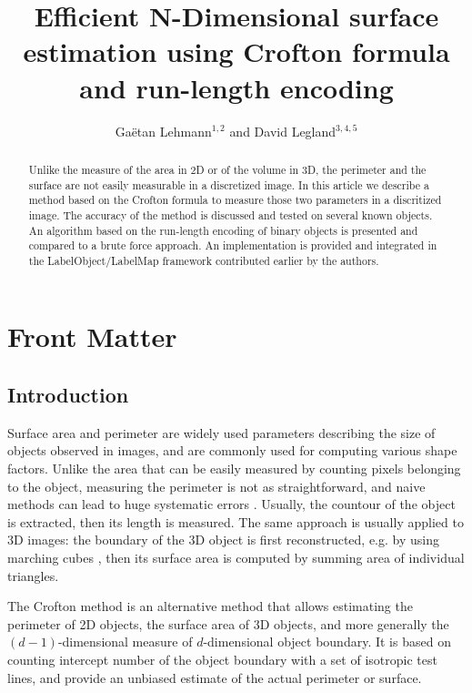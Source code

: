 \documentclass{InsightArticle}
\title{Efficient N-Dimensional surface estimation using Crofton formula and run-length encoding}
\author{Ga\"etan Lehmann$^{1,2}$ {\small{and}} David Legland$^{3,4,5}$}
\begin{document}
\maketitle

\ifhtml
\chapter*{Front Matter\label{front}}
\fi


\begin{abstract}
\noindent
Unlike the measure of the area in 2D or of the volume in 3D, the perimeter and the surface are not easily measurable in a discretized image.
In this article we describe a method based on the Crofton formula to measure those two parameters in a discritized image. The accuracy of
the method is discussed and tested on several known objects. An algorithm based on the run-length encoding of binary objects is presented
and compared to a brute force approach.
An implementation is provided and integrated in the LabelObject/LabelMap framework contributed earlier by the authors.
\end{abstract}

\tableofcontents

\section{Introduction}

Surface area and perimeter are widely used parameters describing the size of objects observed in images, 
and are commonly used for computing various shape factors.
Unlike the area that can be easily measured by counting pixels belonging to the object, measuring the 
perimeter is not as straightforward, 
and naive methods can lead to huge systematic errors \cite{Klette2004, Legland2007}.
Usually, the countour of the object is extracted, then its length is measured.
The same approach is usually applied to 3D images: the boundary of the 3D object is first reconstructed,
e.g. by using marching cubes \cite{Lorensen1987}, then its surface area is computed by summing 
area of individual triangles.

The Crofton method is an alternative method that allows estimating the perimeter of 2D objects,
the surface area of 3D objects, and more generally the $(d-1)$-dimensional measure of $d$-dimensional 
object boundary. 
It is based on counting intercept number of the object boundary with a set of isotropic test lines, 
and provide an unbiased estimate of the actual perimeter or surface.
\end{document}
